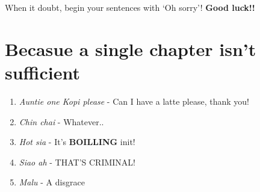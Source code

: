 \documentclass[11pt, a4paper]{report}
\begin{document}
When it doubt, begin your sentences with `Oh sorry'! \textbf{Good luck!!}

\chapter{Becasue a single chapter isn't sufficient}
\begin{enumerate}
    \item \textit{Auntie one Kopi please} - Can I have a latte please, thank you!
    \item \textit{Chin chai} - Whatever..
    \item \textit{Hot sia} - It's \textbf{BOILLING} init!
    \item \textit{Siao ah} - THAT'S CRIMINAL!
    \item \textit{Malu} - A disgrace
\end{enumerate}

\newpage


\end{document}
